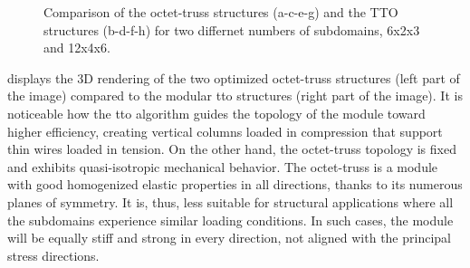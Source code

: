\begin{figure}
    \hfill
    \bigskip
    \hfill
    \caption{Comparison of the octet-truss structures (a-c-e-g) and the TTO structures (b-d-f-h) for two differnet numbers of subdomains, 6x2x3 and 12x4x6.}
    \label{fig:05_octet_results}
\end{figure}

 displays the 3D rendering of the two optimized octet-truss structures (left part of the image) compared to the modular \gls{tto} structures (right part of the image). It is noticeable how the \gls{tto} algorithm guides the topology of the module toward higher efficiency, creating vertical columns loaded in compression that support thin wires loaded in tension. On the other hand, the octet-truss topology is fixed and exhibits quasi-isotropic mechanical behavior. The octet-truss is a module with good homogenized elastic properties in all directions, thanks to its numerous planes of symmetry. It is, thus, less suitable for structural applications where all the subdomains experience similar loading conditions. In such cases, the module will be equally stiff and strong in every direction, not aligned with the principal stress directions.

